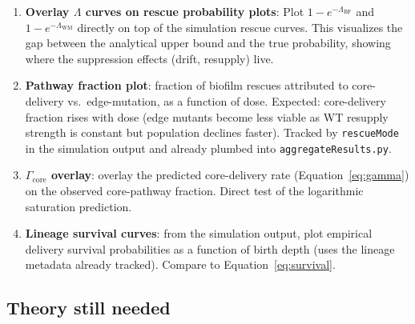 \documentclass[12pt]{article}
\begin{document}
\begin{enumerate}
    \item \textbf{Overlay $\Lambda$ curves on rescue probability plots}:
    Plot $1 - e^{-\Lambda_{\text{BF}}}$ and $1 - e^{-\Lambda_{\text{WM}}}$
    directly on top of the simulation rescue curves. This visualizes the
    gap between the analytical upper bound and the true probability, showing
    where the suppression effects (drift, resupply) live.

    \item \textbf{Pathway fraction plot}: fraction of biofilm rescues
    attributed to core-delivery vs.\ edge-mutation, as a function of dose.
    Expected: core-delivery fraction rises with dose (edge mutants become
    less viable as WT resupply strength is constant but population declines
    faster). Tracked by \texttt{rescueMode} in the simulation output and
    already plumbed into \texttt{aggregateResults.py}.

    \item \textbf{$\Gamma_{\text{core}}$ overlay}: overlay the predicted
    core-delivery rate (Equation~\eqref{eq:gamma}) on the observed
    core-pathway fraction. Direct test of the logarithmic saturation
    prediction.

    \item \textbf{Lineage survival curves}: from the simulation output,
    plot empirical delivery survival probabilities as a function of birth
    depth (uses the lineage metadata already tracked). Compare to
    Equation~\eqref{eq:survival}.
\end{enumerate}

\subsection{Theory still needed}
\end{document}
